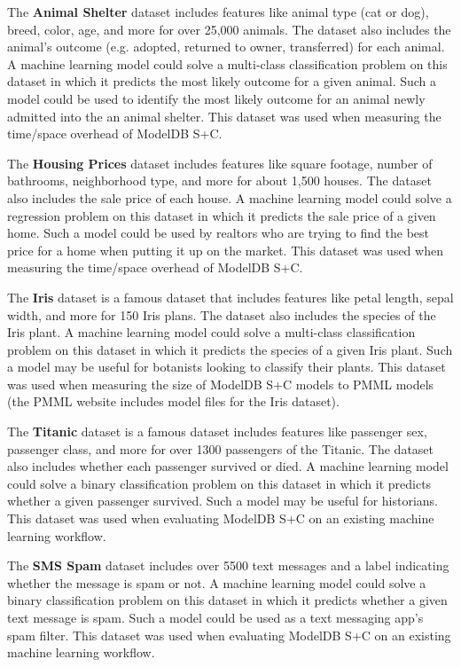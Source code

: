 The \textbf{Animal Shelter} dataset \cite{animal} includes features like
animal type (cat or dog), breed, color, age, and more for over 25,000 animals. The
dataset also includes the animal's outcome (e.g. adopted, returned to owner, transferred)
for each animal. A machine learning model could solve a multi-class classification problem on this dataset
in which it predicts the most likely outcome for a given animal. Such a model could 
be used to identify the most likely outcome for an animal newly admitted into the
an animal shelter. This dataset was used when measuring the time/space overhead
of ModelDB S+C.

The \textbf{Housing Prices} dataset \cite{housing} includes features like square
footage, number of bathrooms, neighborhood type, and more for about 1,500 houses.
The dataset also includes the sale price of each house. A machine learning model
could solve a regression problem on this dataset in which it predicts the sale
price of a given home. Such a model could be used by realtors who
are trying to find the best price for a home when putting it up on the market. This
dataset was used when measuring the time/space overhead of ModelDB S+C.

The \textbf{Iris} dataset \cite{iris} is a famous dataset that includes features
like petal length, sepal width, and more for 150 Iris plans. The dataset also
includes the species of the Iris plant. A machine learning model could solve a 
multi-class classification problem on this dataset in which it predicts the species
of a given Iris plant. Such a model may be useful for botanists looking to classify
their plants. This dataset was used when measuring the size of ModelDB S+C models
to PMML models (the PMML website includes model files for the Iris dataset).

The \textbf{Titanic} dataset \cite{titanic} is a famous dataset includes features like 
passenger sex, passenger class, and more for over 1300 passengers of the Titanic. 
The dataset also includes whether each passenger survived or died. A machine learning
model could solve a binary classification problem on this dataset in which it predicts whether
a given passenger survived. Such a model may be useful for historians. This dataset
was used when evaluating ModelDB S+C on an existing machine learning workflow.

The \textbf{SMS Spam} dataset \cite{spam} includes over 5500 text messages and
a label indicating whether the message is spam or not. A machine learning model
could solve a binary classification problem on this dataset in which it predicts
whether a given text message is spam. Such a model could be used as a text messaging
app's spam filter. This dataset was used when evaluating ModelDB S+C on an existing
machine learning workflow.

